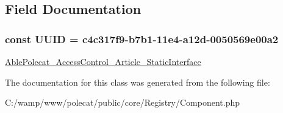 \subsection{Field Documentation}
\hypertarget{class_able_polecat___registry___component_a74b892c8c0b86bf9d04c5819898c51e7}{}
\subsubsection[{U\+U\+I\+D}]{\setlength{\rightskip}{0pt plus 5cm}const U\+U\+I\+D = \textquotesingle{}c4c317f9-\/b7b1-\/11e4-\/a12d-\/0050569e00a2\textquotesingle{}}\label{class_able_polecat___registry___component_a74b892c8c0b86bf9d04c5819898c51e7}
\hyperlink{interface_able_polecat___access_control___article___static_interface}{Able\+Polecat\+\_\+\+Access\+Control\+\_\+\+Article\+\_\+\+Static\+Interface} 

The documentation for this class was generated from the following file\+:\begin{DoxyCompactItemize}
\item 
C\+:/wamp/www/polecat/public/core/\+Registry/Component.\+php\end{DoxyCompactItemize}
